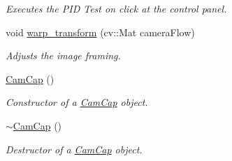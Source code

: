 \begin{DoxyCompactItemize}
\begin{DoxyCompactList}\small\item\em Executes the \textquotesingle{}P\+ID Test on click\textquotesingle{} at the control panel. \end{DoxyCompactList}\item 
void \hyperlink{class_cam_cap_a90c0560e51d69bc551ae17c72edb3028}{warp\+\_\+transform} (cv\+::\+Mat camera\+Flow)
\begin{DoxyCompactList}\small\item\em Adjusts the image framing. \end{DoxyCompactList}\item 
\hyperlink{class_cam_cap_afe0db98a5f72bc9b261dcb78e2840da6}{Cam\+Cap} ()
\begin{DoxyCompactList}\small\item\em Constructor of a \hyperlink{class_cam_cap}{Cam\+Cap} object. \end{DoxyCompactList}\item 
\hyperlink{class_cam_cap_a3d74911ae33294e1714a40fc02e7783d}{$\sim$\+Cam\+Cap} ()
\begin{DoxyCompactList}\small\item\em Destructor of a \hyperlink{class_cam_cap}{Cam\+Cap} object. \end{DoxyCompactList}\end{DoxyCompactItemize}
